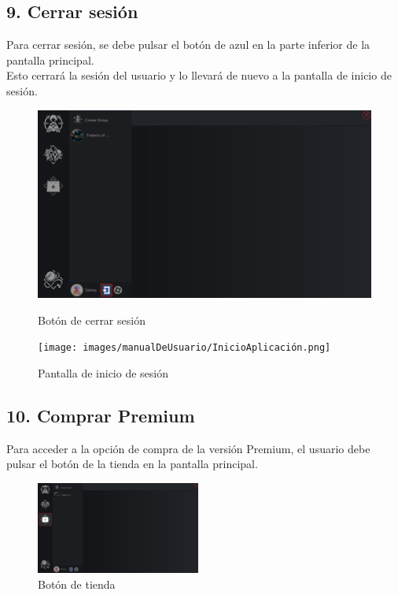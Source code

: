 \subsection*{9. Cerrar sesión}
Para cerrar sesión, se debe pulsar el botón de azul en la parte inferior de la pantalla principal.\\
Esto cerrará la sesión del usuario y lo llevará de nuevo a la pantalla de inicio de sesión.

\begin{figure}[H]
    \centering
    \begin{minipage}[b]{0.5\textwidth}
        \centering
        \includegraphics[width=\textwidth]{images/manualDeUsuario/Logout1.png}
        \caption*{Botón de cerrar sesión}
    \end{minipage}
    \hfill
    \begin{minipage}[b]{0.48\textwidth}
        \centering
        \texttt{[image: images/manualDeUsuario/InicioAplicación.png]}
        \caption*{Pantalla de inicio de sesión}
    \end{minipage}
\end{figure}

\newpage

\subsection*{10. Comprar Premium}
Para acceder a la opción de compra de la versión Premium, el usuario debe pulsar el botón de la tienda en la pantalla principal.

\begin{figure}[H]
    \centering
    \includegraphics[width=0.48\textwidth]{images/manualDeUsuario/HacerPremium1.png}
    \caption*{Botón de tienda}
\end{figure}

